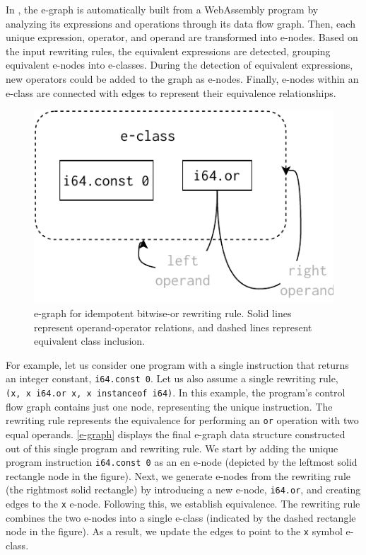 In \tool, the e-graph is automatically built from a WebAssembly program by analyzing its expressions and operations through its data flow graph.
Then, each unique expression, operator, and operand are transformed into e-nodes.
Based on the input rewriting rules, the equivalent expressions are detected, grouping equivalent e-nodes into e-classes.
During the detection of equivalent expressions, new operators could be added to the graph as e-nodes.
Finally, e-nodes within an e-class are connected with edges to represent their equivalence relationships.
\begin{figure}
    \centering
    \includegraphics[width=0.5\linewidth]{figures/egraph1.pdf}
    \caption{e-graph for idempotent bitwise-or rewriting rule. Solid lines represent operand-operator relations, and dashed lines represent equivalent class inclusion. }
  \label{e-graph}
\end{figure}

For example, let us consider one program with a single instruction that returns an integer constant, \texttt{i64.const 0}. Let us also assume a single rewriting rule, \texttt{(x,\ x\ i64.or\ x, x instanceof i64)}. 
In this example, the program's control flow graph contains just one node, representing the unique instruction.
The rewriting rule represents the equivalence for performing an \texttt{or} operation with two equal operands.
\autoref{e-graph} displays the final e-graph data structure constructed out of this single program and rewriting rule. 
We start by adding the unique program instruction \texttt{i64.const 0} as an en e-node (depicted by the leftmost solid rectangle node in the figure). 
Next, we generate e-nodes from the rewriting rule (the rightmost solid rectangle) by introducing a new e-node, \texttt{i64.or}, and creating edges to the \texttt{x} e-node.
Following this, we establish equivalence. 
The rewriting rule combines the two e-nodes into a single e-class (indicated by the dashed rectangle node in the figure). 
As a result, we update the edges to point to the \texttt{x} symbol e-class.

